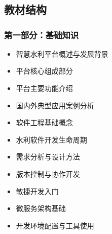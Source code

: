 \hypertarget{section-1}{%
\section{}\label{section-1}}


\hypertarget{ux6559ux6750ux7ed3ux6784-1}{%
\subsection{教材结构}\label{ux6559ux6750ux7ed3ux6784-1}}

\hypertarget{ux7b2cux4e00ux90e8ux5206ux57faux7840ux77e5ux8bc6-1}{%
\subsubsection{第一部分：基础知识}\label{ux7b2cux4e00ux90e8ux5206ux57faux7840ux77e5ux8bc6-1}}


\begin{itemize}
\tightlist
\item
  智慧水利平台概述与发展背景
\item
  平台核心组成部分
\item
  平台主要功能介绍
\item
  国内外典型应用案例分析
\end{itemize}


\begin{itemize}
\tightlist
\item
  软件工程基础概念
\item
  水利软件开发生命周期
\item
  需求分析与设计方法
\end{itemize}


\begin{itemize}
\tightlist
\item
  版本控制与协作开发
\item
  敏捷开发入门
\item
  微服务架构基础
\item
  开发环境配置与工具使用
\end{itemize}

